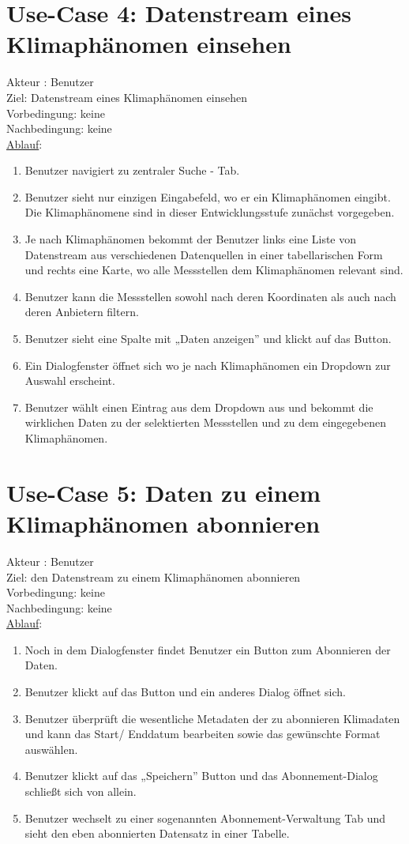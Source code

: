 \documentclass[a4paper,12pt]{scrreprt}
\begin{document}
	\section*{\small \textbf{Use-Case 4: Datenstream eines Klimaphänomen einsehen}}
	Akteur : Benutzer\\
	Ziel: Datenstream eines Klimaphänomen einsehen\\
	Vorbedingung: keine\\
	Nachbedingung: keine\\
	\underline{Ablauf}:
	\begin{enumerate}
		\item Benutzer navigiert zu zentraler Suche - Tab.
		\item Benutzer sieht nur einzigen Eingabefeld, wo er ein Klimaphänomen eingibt. Die Klimaphänomene sind in dieser Entwicklungsstufe zunächst vorgegeben.
		\item Je nach Klimaphänomen bekommt der Benutzer links eine Liste von Datenstream aus verschiedenen Datenquellen in einer tabellarischen Form und rechts eine Karte, wo alle Messstellen dem Klimaphänomen relevant sind.
		\item Benutzer kann die Messstellen sowohl nach deren Koordinaten als auch nach deren Anbietern filtern.
		\item Benutzer sieht eine Spalte mit „Daten anzeigen” und klickt auf das Button.
		\item Ein Dialogfenster öffnet sich wo je nach Klimaphänomen ein Dropdown zur Auswahl erscheint.
		\item Benutzer wählt einen Eintrag aus dem Dropdown aus und bekommt die wirklichen Daten zu der selektierten Messstellen und zu dem eingegebenen Klimaphänomen.
	\end{enumerate}
	
	\section*{\small \textbf{Use-Case 5: Daten zu einem Klimaphänomen abonnieren}}
	Akteur : Benutzer\\
	Ziel: den Datenstream zu einem Klimaphänomen abonnieren\\
	Vorbedingung: keine\\
	Nachbedingung: keine\\
	\underline{Ablauf}:
	\begin{enumerate}
		\item Noch in dem Dialogfenster findet Benutzer ein Button zum Abonnieren der Daten. 
		\item Benutzer klickt auf das Button und ein anderes Dialog öffnet sich.
		\item Benutzer überprüft die wesentliche Metadaten der zu abonnieren Klimadaten und kann das Start/ Enddatum bearbeiten sowie das gewünschte Format auswählen.
		\item Benutzer klickt auf das „Speichern” Button und  das Abonnement-Dialog schließt sich von allein.
		\item Benutzer wechselt zu einer sogenannten Abonnement-Verwaltung Tab und sieht den eben abonnierten Datensatz in einer Tabelle.
	\end{enumerate}
	
\end{document}
